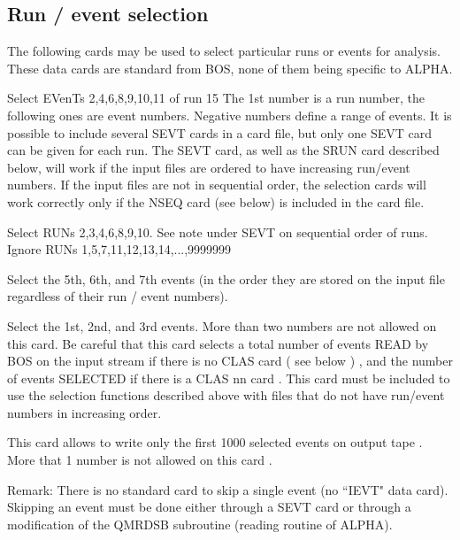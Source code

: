 \par
\subsection{\label{sec-DCRS}{Run / event selection}}
\par
\par The following cards may be used to select particular
runs or events for analysis. These data cards are standard from BOS, none of them being specific to ALPHA.
\begin{indentlist}{ 4.50cm}{ 4.75cm}
Select EVenTs 2,4,6,8,9,10,11 of run 15
The 1st number is a run number, the following ones are event numbers.
Negative numbers define a range of events. It is possible to include
several SEVT cards in a card file, but
only one SEVT card can be
given for each run. The SEVT card, as well as the SRUN card described
below, will work if the input files are ordered to have increasing
run/event numbers. If the input files are not in sequential order,
the
selection cards
will work correctly only if the NSEQ card (see below) is
included in the card file.
 
Select RUNs 2,3,4,6,8,9,10.
See note under SEVT on sequential order of runs.
Ignore RUNs 1,5,7,11,12,13,14,...,9999999
 
Select the 5th, 6th, and 7th events (in the order they are stored
on
the input file regardless of their run / event numbers).
 
Select the 1st, 2nd, and 3rd events.
More than two numbers are not allowed on this card.
Be careful that this card selects a total number of events READ by BOS on the input stream
if there is no CLAS card ( see below ) , and the number of events SELECTED if there is a CLAS nn card .
This card must be included to use the selection functions described
above with files that do not have run/event numbers in increasing
order.
 
This card allows to write only the first 1000 selected events on output
tape . More that 1 number is not allowed on this card .
\end{indentlist}

Remark: There is no standard card to skip a single event (no ``IEVT" data card). 
Skipping an event must be done either through a SEVT card or through 
a modification of the QMRDSB subroutine (reading routine of ALPHA).

